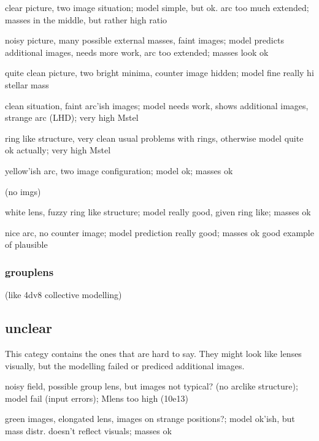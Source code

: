   clear picture, two image situation;
  model simple, but ok. arc too much extended;
  masses in the middle, but rather high ratio
  
  noisy picture, many possible external masses, faint images;
  model predicts additional images, needs more work, arc too extended;
  masses look ok
  
  quite clean picture, two bright minima, counter image hidden;
  model fine
  really hi stellar mass
  
  clean situation, faint arc'ish images;
  model needs work, shows additional images, strange arc (LHD);
  very high Mstel
  
  ring like structure, very clean
  usual problems with rings, otherwise model quite ok actually;
  very high Mstel
  
  yellow'ish arc, two image configuration;
  model ok;
  masses ok
  
  (no imgs)
  
  white lens, fuzzy ring like structure;
  model really good, given ring like;
  masses ok
  
  nice arc, no counter image;
  model prediction really good;
  masses ok
  good example of plausible

\subsubsection{grouplens}

(like 4dv8 collective modelling)

\subsection{unclear}

This categy contains the ones that are hard to say.
They might look like lenses visually, but the modelling failed or prediced additional images.



  noisy field, possible group lens, but images not typical? (no arclike structure);
  model fail (input errors);
  Mlens too high (10e13)
  
  green images, elongated lens, images on strange positions?;
  model ok'ish, but mass distr. doesn't reflect visuals;
  masses ok
  
